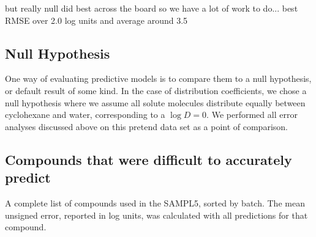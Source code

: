 but really null did best across the board so we have a lot of work to do... best RMSE over 2.0 log units and average around 3.5

\subsection{Null Hypothesis}
\label{results:3}
One way of evaluating predictive models is to compare them to a null hypothesis, or default result of some kind. 
In the case of distribution coefficients, we chose a null hypothesis where we assume all solute molecules distribute equally between cyclohexane and water, corresponding to a $\log D = 0$. 
We performed all error analyses discussed above on this pretend data set as a point of comparison. 


\subsection{Compounds that were difficult to accurately predict}

\label{results:4}
\begin{table}

\label{MoleculeTable}
\caption{A complete list of compounds used in the SAMPL5, sorted by batch. The mean unsigned error, reported in log units, was calculated with all predictions for that compound.} 
\end{table}


